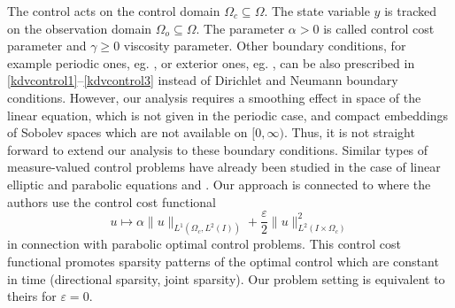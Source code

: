 The control acts on the control domain $\Omega_c\subseteq \Omega$. The state variable $y$ is tracked on the observation domain $\Omega_{o}\subseteq\Omega$. The parameter $\alpha > 0$ is called control cost parameter and  $\gamma \geq 0$ viscosity parameter. {\color{red} Other boundary conditions, for example periodic ones, eg. \cite{Bourgain93}, or exterior ones, eg. \cite{BonaWinther83}, can be also prescribed in \eqref{kdvcontrol1}--\eqref{kdvcontrol3} instead of Dirichlet and Neumann boundary conditions. However, our analysis requires a smoothing effect in space of the linear \KdVB equation, which is not given in the periodic case, and compact embeddings of Sobolev spaces which are not available on $[0,\infty)$. Thus, it is not straight forward to extend our analysis to these boundary conditions.} %
Similar types of measure-valued control problems have already been studied in the case of linear elliptic and parabolic equations \cite{pieper2013priori,clason2011duality,casas2012approximation,ClasonKunisch:2011b} and \cite{casas2013parabolic,CasasZuazua13,CasasVexlerZuazua13,CasasKunisch15}. Our approach is connected to \cite{herzog2012directional} where the authors use the control cost functional
\[
u\mapsto\alpha \|u\|_{L^1(\Omega_c,L^2(I))}+\frac \varepsilon 2 \|u\|_{L^2(I\times \Omega_c)}^2
\]
in connection with parabolic optimal control problems. This control cost functional promotes sparsity patterns of the optimal control which are constant in time (directional sparsity, joint sparsity). Our problem setting is equivalent to theirs for $\varepsilon=0$. %
